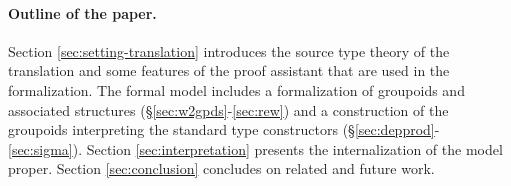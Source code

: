 

\paragraph{\bf Outline of the paper.}
Section \ref{sec:setting-translation} introduces the source type
theory of the translation and some features of the proof assistant
that are used in the formalization. The formal model includes a
formalization of groupoids and associated structures
(\S\ref{sec:w2gpds}-\ref{sec:rew}) and a construction of the groupoids
interpreting the standard type constructors
(\S\ref{sec:depprod}-\ref{sec:sigma}). Section
\ref{sec:interpretation} presents the internalization of the model proper.
 Section \ref{sec:conclusion} concludes on related and future work.
%

